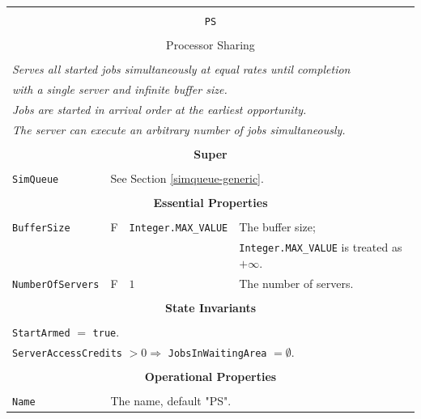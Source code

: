\documentclass[12pt]{book}
\begin{document}
\begin{tabular}{|l|l|l|l|}
\hline
\multicolumn{4}{|c|}{} \\
\multicolumn{4}{|c|}{\lstinline[basicstyle=\large]{PS}} \\
\multicolumn{4}{|c|}{} \\
\multicolumn{4}{|c|}{Processor Sharing} \\
\multicolumn{4}{|c|}{} \\
\hline
\multicolumn{4}{|l|}{\em Serves all started jobs simultaneously at equal rates until completion} \\
\multicolumn{4}{|l|}{\em with a single server and infinite buffer size.} \\
\multicolumn{4}{|l|}{\em Jobs are started in arrival order at the earliest opportunity.} \\
\multicolumn{4}{|l|}{\em The server can execute an arbitrary number of jobs simultaneously.} \\
\hline
\multicolumn{4}{|c|}{} \\
\multicolumn{4}{|c|}{\bf Super} \\
\multicolumn{4}{|c|}{} \\
\hline
\lstinline|SimQueue| & \multicolumn{3}{|l|}{See Section \ref{simqueue-generic}.} \\
\hline
\multicolumn{4}{|c|}{} \\
\multicolumn{4}{|c|}{\bf Essential Properties} \\
\multicolumn{4}{|c|}{} \\
\hline
\lstinline|BufferSize|      & F & \lstinline|Integer.MAX_VALUE|
                            & The buffer size; \\
                        & & & \lstinline|Integer.MAX_VALUE| is treated as $+\infty$. \\
\hline
\lstinline|NumberOfServers|    & F & $1$
                               & The number of servers. \\
\hline
\multicolumn{4}{|c|}{} \\
\multicolumn{4}{|c|}{\bf State  Invariants} \\
\multicolumn{4}{|c|}{} \\
\hline
\multicolumn{4}{|l|}{\lstinline|StartArmed| $=$ \lstinline|true|.} \\
\multicolumn{4}{|l|}{\lstinline|ServerAccessCredits| $> 0 \Rightarrow$ \lstinline|JobsInWaitingArea| $= \emptyset$.} \\
\hline
\multicolumn{4}{|c|}{} \\
\multicolumn{4}{|c|}{\bf Operational Properties} \\
\multicolumn{4}{|c|}{} \\
\hline
\lstinline|Name| & \multicolumn{3}{|l|}{The name, default "PS".} \\
\hline
\end{tabular}
\end{document}
